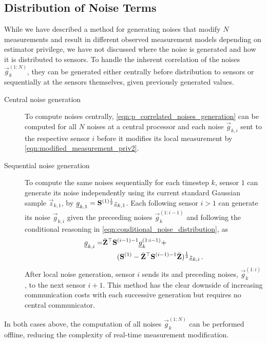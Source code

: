 % 
% 

\subsection{Distribution of Noise Terms}\label{subsec:priv_estimation:fus_noise_dist}
While we have described a method for generating noises that modify $N$ measurements and result in different observed measurement models depending on estimator privilege, we have not discussed where the noise is generated and how it is distributed to sensors. To handle the inherent correlation of the noises $\vec{g}_{k}^{(1:N)}$, they can be generated either centrally before distribution to sensors or sequentially at the sensors themselves, given previously generated values.
\begin{description}
  \item[Central noise generation] To compute noises centrally, \eqref{eqn:p_correlated_noises_generation} can be computed for all $N$ noises at a central processor and each noise $\vec{g}_{k,i}$ sent to the respective sensor $i$ before it modifies its local measurement by \eqref{eqn:modified_measurement_priv2}.
  \item[Sequential noise generation] To compute the same noises sequentially for each timestep $k$, sensor $1$ can generate its noise independently using its current standard Gaussian sample $\vec{z}_{k,1}$, by ${\underline{g}}_{k,1} = {{\mathbf{S}}}^{(1)\frac{1}{2}}{\underline{z}}_{k,1}$. Each following sensor $i>1$ can generate its noise $\vec{g}_{k,i}$ given the preceeding noises $\vec{g}_k^{(1:i-1)}$ and following the conditional reasoning in \eqref{eqn:conditional_noise_distribution}, as
  \begin{equation}
    \begin{split}
      {\underline{g}}_{k,i} = &\bar{{{\mathbf{Z}}}}^\top{\ensuremath{{\mathbf{S}}}}^{(i-1)-1}{\underline{g}}_k^{(1:i-1)} +\\
      &\qquad ({{\mathbf{S}}}^{(1)}-\bar{{{\mathbf{Z}}}}^\top{\ensuremath{{\mathbf{S}}}}^{(i-1)-1}\bar{{{\mathbf{Z}}}})^\frac{1}{2}{\underline{z}}_{k,i}\,.
    \end{split}
  \end{equation}
  After local noise generation, sensor $i$ sends its and preceding noises, $\vec{g}_k^{(1:i)}$, to the next sensor $i+1$. This method has the clear downside of increasing communication costs with each successive generation but requires no central communicator.
\end{description}
In both cases above, the computation of all noises $\vec{g}_k^{(1:N)}$ can be performed offline, reducing the complexity of real-time measurement modification.

